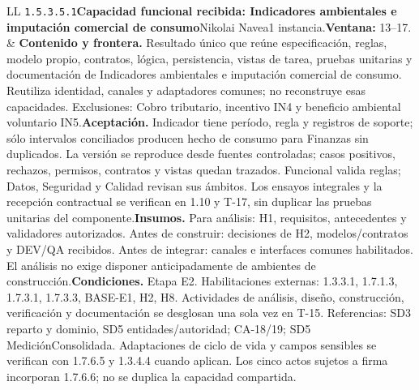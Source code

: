 \begin{longtable}{L{\tabcolsep\relax}L{\tabcolsep\relax}}
\texttt{1.\allowbreak{}5.\allowbreak{}3.\allowbreak{}5.\allowbreak{}1}\newline{}\textbf{Capacidad funcional recibida: Indicadores ambientales e imputación comercial de consumo}\newline{}Nikolai Navea\newline{}1 instancia.\newline{}\textbf{Ventana:} 13--17. & \textbf{Contenido y frontera.} Resultado único que reúne especificación, reglas, modelo propio, contratos, lógica, persistencia, vistas de tarea, pruebas unitarias y documentación de Indicadores ambientales e imputación comercial de consumo. Reutiliza identidad, canales y adaptadores comunes; no reconstruye esas capacidades. Exclusiones: Cobro tributario, incentivo IN4 y beneficio ambiental voluntario IN5.\newline{}\textbf{Aceptación.} Indicador tiene período, regla y registros de soporte; sólo intervalos conciliados producen hecho de consumo para Finanzas sin duplicados. La versión se reproduce desde fuentes controladas; casos positivos, rechazos, permisos, contratos y vistas quedan trazados. Funcional valida reglas; Datos, Seguridad y Calidad revisan sus ámbitos. Los ensayos integrales y la recepción contractual se verifican en 1.10 y T-17, sin duplicar las pruebas unitarias del componente.\newline{}\textbf{Insumos.} Para análisis: H1, requisitos, antecedentes y validadores autorizados. Antes de construir: decisiones de H2, modelos/contratos y DEV/QA recibidos. Antes de integrar: canales e interfaces comunes habilitados. El análisis no exige disponer anticipadamente de ambientes de construcción.\newline{}\textbf{Condiciones.} Etapa E2. Habilitaciones externas: 1.3.3.1, 1.7.1.3, 1.7.3.1, 1.7.3.3, BASE-E1, H2, H8. Actividades de análisis, diseño, construcción, verificación y documentación se desglosan una sola vez en T-15. Referencias: SD3 reparto y dominio, SD5 entidades/autoridad; CA-18/19; SD5 MediciónConsolidada. Adaptaciones de ciclo de vida y campos sensibles se verifican con 1.7.6.5 y 1.3.4.4 cuando aplican. Los cinco actos sujetos a firma incorporan 1.7.6.6; no se duplica la capacidad compartida.\\\hline
\end{longtable}\endgroup
\begingroup\setlength{\tabcolsep}{3pt}
